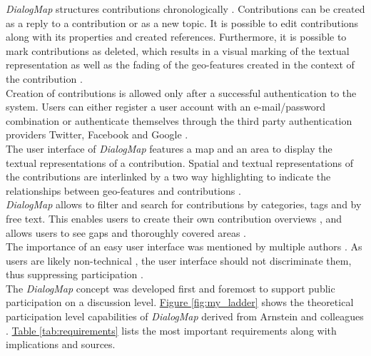 \textit{DialogMap} structures contributions chronologically \cite{Cherubini2007_shared_maps,you2009_participatory_map_based}. Contributions can be created as a reply to a contribution or as a new topic. It is possible to edit contributions along with its properties and created references. Furthermore, it is possible to mark contributions as deleted, which results in a visual marking of the textual representation as well as the fading of the geo-features created in the context of the contribution \cite{Hopfer2007_Communication}.\\
Creation of contributions is allowed only after a successful authentication to the system. Users can either register a user account with an e-mail/password combination or authenticate themselves through the third party authentication providers Twitter, Facebook and Google \cite{Sani2011_Scalable_Argumap,chun2014usability}.\\
The user interface of \textit{DialogMap} features a map and an area to display the textual representations of a contribution. Spatial and textual representations of the contributions are interlinked by a two way highlighting to indicate the relationships between geo-features and contributions \cite{Cai2009_spatial_annotation_deliberation,Sidlar2009-AssessmentMapGeocollaborationTool}.\\
\textit{DialogMap} allows to filter and search for contributions by categories, tags and by free text. This enables users to create their own contribution overviews \cite{Voss2004_Evolution_PGIS,you2009_participatory_map_based}, and allows users to see gaps and thoroughly covered areas \cite{Hopfer2007_Communication}.\\
The importance of an easy user interface was mentioned by multiple authors \cite{Rinner2009_Web2_argumap,Jankowski2005_community_based_pgis,Tang2005_PPGIS_discussion_forum,zhao2006geodf,you2009_participatory_map_based}. As users are likely non-technical \cite{Cai2009_spatial_annotation_deliberation}, the user interface should not discriminate them, thus suppressing participation \cite{Carver2001_PPGIS_Cyberdemocracy}.\\
The \textit{DialogMap} concept was developed first and foremost to support public participation on a discussion level. \hyperref[fig:my_ladder]{Figure \ref{fig:my_ladder}} shows the theoretical participation level capabilities of \textit{DialogMap} derived from Arnstein and colleagues \cite{Arnstein1969_citizen_participation,Wiedemann1993355,Connor1988_new_ladder}. \hyperref[tab:requirements]{Table \ref{tab:requirements}} lists the most important requirements along with implications and sources.\\
